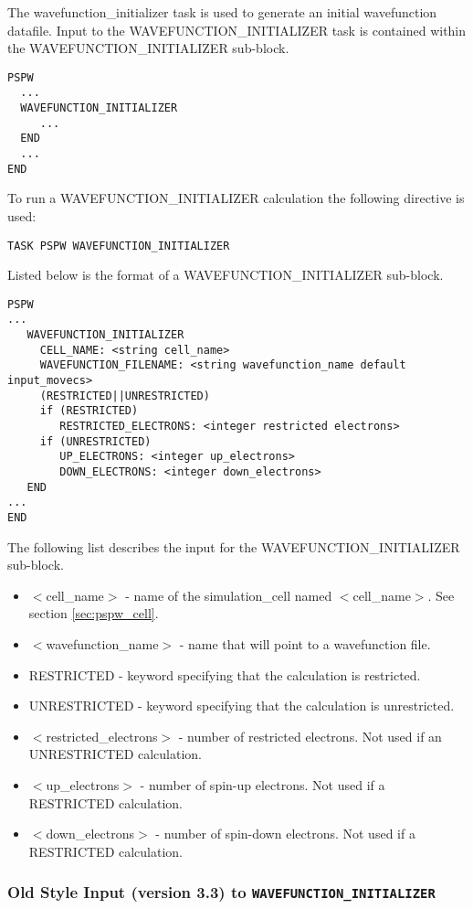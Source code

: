 The wavefunction\_initializer task is used to generate an initial wavefunction
datafile.
Input to the WAVEFUNCTION\_INITIALIZER task is contained
within the WAVEFUNCTION\_INITIALIZER sub-block.
\begin{verbatim}
PSPW
  ...
  WAVEFUNCTION_INITIALIZER
     ...
  END
  ...
END
\end{verbatim}
To run a WAVEFUNCTION\_INITIALIZER calculation the following directive 
is used:
\begin{verbatim}
TASK PSPW WAVEFUNCTION_INITIALIZER
\end{verbatim}
Listed below is the format of a WAVEFUNCTION\_INITIALIZER sub-block.
\begin{verbatim}
PSPW
... 
   WAVEFUNCTION_INITIALIZER
     CELL_NAME: <string cell_name>
     WAVEFUNCTION_FILENAME: <string wavefunction_name default input_movecs>
     (RESTRICTED||UNRESTRICTED)
     if (RESTRICTED)   
        RESTRICTED_ELECTRONS: <integer restricted electrons>
     if (UNRESTRICTED) 
        UP_ELECTRONS: <integer up_electrons>
        DOWN_ELECTRONS: <integer down_electrons>
   END
...
END
\end{verbatim}
The following list describes the input for the WAVEFUNCTION\_INITIALIZER
sub-block.
\begin{itemize}
        \item $<$cell\_name$>$ - name of
                the simulation\_cell named $<$cell\_name$>$.  See section \ref{sec:pspw_cell}.
        \item $<$wavefunction\_name$>$ - name that will point
              to a wavefunction file.
        \item RESTRICTED - keyword specifying that the calculation is restricted.
        \item UNRESTRICTED - keyword specifying that the calculation is unrestricted.

        \item $<$restricted\_electrons$>$ - number of restricted electrons.
               Not used if an UNRESTRICTED calculation. 
         \item $<$up\_electrons$>$ - number of spin-up electrons.
               Not used if a RESTRICTED calculation.
        \item $<$down\_electrons$>$ - number of spin-down electrons.
              Not used if a RESTRICTED calculation.
\end{itemize}

\subsubsection{Old Style Input (version 3.3) to {\tt WAVEFUNCTION\_INITIALIZER}}

